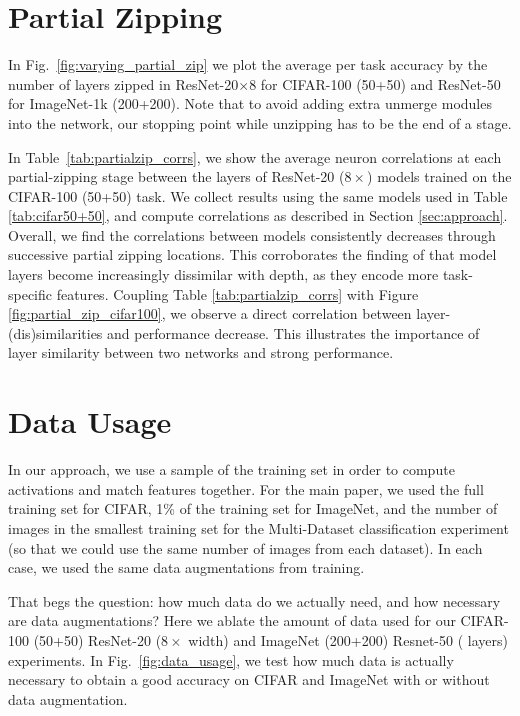 \section{Partial Zipping}\label{ap:partial_zipping}
In Fig.~\ref{fig:varying_partial_zip} we plot the average per task accuracy by the number of layers zipped in ResNet-20$\times$8 for CIFAR-100 (50+50) and ResNet-50 for ImageNet-1k (200+200). 
Note that to avoid adding extra unmerge modules into the network, our stopping point while unzipping has to be the end of a stage. 

In Table~\ref{tab:partialzip_corrs}, we show the average neuron correlations at each partial-zipping stage between the layers of ResNet-20 ($8\times$) models trained on the CIFAR-100 (50+50) task. 
We collect results using the same models used in Table \ref{tab:cifar50+50}, and compute correlations as described in Section \ref{sec:approach}.
Overall, we find the correlations between models consistently decreases through successive partial zipping locations. 
This corroborates the finding of \citet{kornblith2019similarity} that model layers become increasingly dissimilar with depth, as they encode more task-specific features. 
Coupling Table \ref{tab:partialzip_corrs} with Figure \ref{fig:partial_zip_cifar100}, we observe a direct correlation between layer-(dis)similarities and performance decrease.
This illustrates the importance of layer similarity between two networks and strong performance.






\section{Data Usage} \label{ap:data_usage}
In our approach, we use a sample of the training set in order to compute activations and match features together. For the main paper, we used the full training set for CIFAR, 1\% of the training set for ImageNet, and the number of images in the smallest training set for the Multi-Dataset classification experiment (so that we could use the same number of images from each dataset). In each case, we used the same data augmentations from training.

That begs the question: how much data do we actually need, and how necessary are data augmentations?
Here we ablate the amount of data used for our CIFAR-100 (50+50) ResNet-20 ($8\times$ width) and ImageNet (200+200) Resnet-50 ( layers) experiments. 
In Fig.~\ref{fig:data_usage}, we test how much data is actually necessary to obtain a good accuracy on CIFAR and ImageNet with or without data augmentation.

